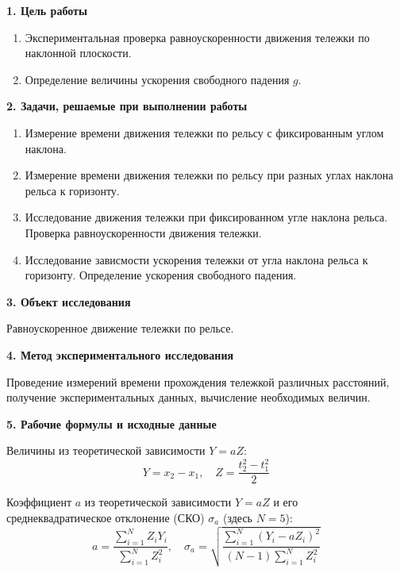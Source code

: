 \documentclass[14pt]{extreport}
\begin{document}
\SETtitleT{}


\noindent\textbf{1. Цель работы}

\begin{enumerate}[label=\arabic*)]
    \item Экспериментальная проверка равноускоренности движения
тележки по наклонной плоскости.
    \item Определение величины ускорения свободного падения $g$.
\end{enumerate}

\noindent\textbf{2. Задачи, решаемые при выполнении работы}

\begin{enumerate}[label=\arabic*)]
    \item Измерение времени движения тележки по рельсу с фиксированным углом наклона.
    \item Измерение времени движения тележки по рельсу при разных углах наклона рельса к горизонту.
    \item  Исследование движения тележки при фиксированном угле наклона рельса. Проверка равноускоренности движения тележки.
    \item  Исследование зависмости ускорения тележки от угла наклона рельса к горизонту. Определение ускорения свободного падения.
\end{enumerate}

\noindent\textbf{3. Объект исследования}

Равноускоренное движение тележки по рельсе.

\noindent\textbf{4. Метод экспериментального исследования}

Проведение измерений времени прохождения тележкой различных расстояний, получение экспериментальных данных, вычисление необходимых величин.

\noindent\textbf{5. Рабочие формулы и исходные данные}

Величины из теоретической зависимости $Y=aZ$:
\begin{equation*}
    Y=x_2 - x_1, \quad Z= \frac{t_2^2-t_1^2}{2}
\end{equation*}

Коэффициент $a$  из теоретической зависимости $Y=aZ$ и его среднеквадратическое отклонение (СКО) $\sigma_a$ (здесь $N = 5$):
\begin{equation*}
    a=\frac{\sum\limits^{N}_{i=1}Z_iY_i}{\sum\limits^{N}_{i=1}Z_i^2}, \quad 
    \sigma_a=\sqrt{\frac{\sum\limits^{N}_{i=1}(Y_i-aZ_i)^2}{(N-1)\sum\limits^{N}_{i=1}Z_i^2}}
\end{equation*}
\end{document}
